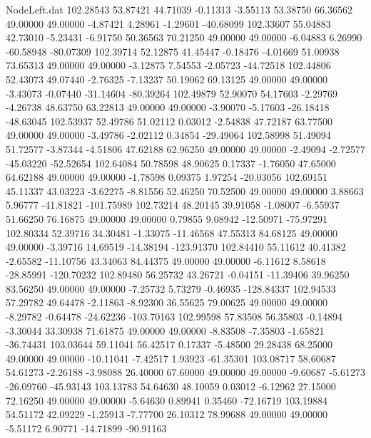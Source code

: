 \begin{filecontents}{NodeLeft.dat}
 102.28543   53.87421   44.71039    -0.11313   -3.55113   53.38750   66.36562   49.00000   49.00000   -4.87421    4.28961   -1.29601  -40.68099
 102.33607   55.04883   42.73010    -5.23431   -6.91750   50.36563   70.21250   49.00000   49.00000   -6.04883    6.26990  -60.58948  -80.07309
 102.39714   52.12875   41.45447    -0.18476   -4.01669   51.00938   73.65313   49.00000   49.00000   -3.12875    7.54553   -2.05723  -44.72518
 102.44806   52.43073   49.07440    -2.76325   -7.13237   50.19062   69.13125   49.00000   49.00000   -3.43073   -0.07440  -31.14604  -80.39264
 102.49879   52.90070   54.17603    -2.29769   -4.26738   48.63750   63.22813   49.00000   49.00000   -3.90070   -5.17603  -26.18418  -48.63045
 102.53937   52.49786   51.02112     0.03012   -2.54838   47.72187   63.77500   49.00000   49.00000   -3.49786   -2.02112    0.34854  -29.49064
 102.58998   51.49094   51.72577    -3.87344   -4.51806   47.62188   62.96250   49.00000   49.00000   -2.49094   -2.72577  -45.03220  -52.52654
 102.64084   50.78598   48.90625     0.17337   -1.76050   47.65000   64.62188   49.00000   49.00000   -1.78598    0.09375    1.97254  -20.03056
 102.69151   45.11337   43.03223    -3.62275   -8.81556   52.46250   70.52500   49.00000   49.00000    3.88663    5.96777  -41.81821 -101.75989
 102.73214   48.20145   39.91058    -1.08007   -6.55937   51.66250   76.16875   49.00000   49.00000    0.79855    9.08942  -12.50971  -75.97291
 102.80334   52.39716   34.30481    -1.33075  -11.46568   47.55313   84.68125   49.00000   49.00000   -3.39716   14.69519  -14.38194 -123.91370
 102.84410   55.11612   40.41382    -2.65582  -11.10756   43.34063   84.44375   49.00000   49.00000   -6.11612    8.58618  -28.85991 -120.70232
 102.89480   56.25732   43.26721    -0.04151  -11.39406   39.96250   83.56250   49.00000   49.00000   -7.25732    5.73279   -0.46935 -128.84337
 102.94533   57.29782   49.64478    -2.11863   -8.92300   36.55625   79.00625   49.00000   49.00000   -8.29782   -0.64478  -24.62236 -103.70163
 102.99598   57.83508   56.35803    -0.14894   -3.30044   33.30938   71.61875   49.00000   49.00000   -8.83508   -7.35803   -1.65821  -36.74431
 103.03644   59.11041   56.42517     0.17337   -5.48500   29.28438   68.25000   49.00000   49.00000  -10.11041   -7.42517    1.93923  -61.35301
 103.08717   58.60687   54.61273    -2.26188   -3.98088   26.40000   67.60000   49.00000   49.00000   -9.60687   -5.61273  -26.09760  -45.93143
 103.13783   54.64630   48.10059     0.03012   -6.12962   27.15000   72.16250   49.00000   49.00000   -5.64630    0.89941    0.35460  -72.16719
 103.19884   54.51172   42.09229    -1.25913   -7.77700   26.10312   78.99688   49.00000   49.00000   -5.51172    6.90771  -14.71899  -90.91163

\end{filecontents}
